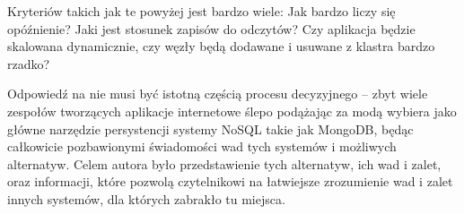 Kryteriów takich jak te powyżej jest bardzo wiele: 
Jak bardzo liczy się opóźnienie? 
Jaki jest stosunek zapisów do odczytów? 
Czy aplikacja będzie skalowana dynamicznie, czy węzły będą dodawane i usuwane z klastra bardzo rzadko?

Odpowiedź na nie musi być istotną częścią procesu decyzyjnego -- zbyt wiele zespołów tworzących aplikacje internetowe ślepo podążając za modą wybiera jako główne narzędzie persystencji systemy NoSQL takie jak MongoDB, będąc całkowicie pozbawionymi świadomości wad tych systemów i możliwych alternatyw.
Celem autora było przedstawienie tych alternatyw, ich wad i zalet, oraz informacji, które pozwolą czytelnikowi na łatwiejsze zrozumienie wad i zalet innych systemów, dla których zabrakło tu miejsca.